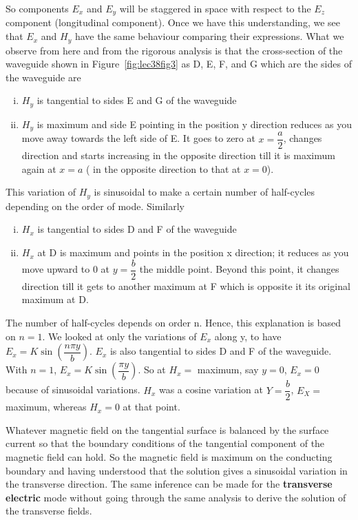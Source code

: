 So components $E_x$ and $E_y$ will be staggered in space with respect to the $E_z$ component (longitudinal component). Once we have this understanding, we see that $E_x$ and $H_y$ have the same behaviour comparing their expressions. What we observe from here and from the rigorous analysis is that the cross-section of the waveguide shown in Figure~\ref{fig:lec38fig3} as D, E, F, and G which are the sides of the waveguide are
\begin{enumerate}[(i)]
\item $H_y$ is tangential to sides E and G of the waveguide
\item $H_y$ is maximum and side E pointing in the position y direction reduces as you move away towards the left side of E. It goes to zero at $x=\dfrac{a}{2}$, changes direction and starts increasing in the opposite direction till it is maximum again at $x=a$ ( in the opposite direction to that at $x=0$). 
\end{enumerate}
This variation of $H_y$ is sinusoidal to make a certain number of half-cycles depending on the order of mode. Similarly 
\begin{enumerate}[(i)]
\item $H_x$ is tangential to sides D and F of the waveguide
\item $H_x$ at D is maximum and points in the position x direction; it reduces as you move upward to 0 at $y=\dfrac{b}{2}$ the middle point. Beyond this point, it changes direction till it gets to another maximum at F which is opposite it its original maximum at D. 
\end{enumerate}
The number of half-cycles depends on order n. Hence, this explanation is based on $n=1$. We looked at only the variations of $E_x$ along y, to have $E_x = K\sin\left(\dfrac{n\pi y}{b}\right)$. $E_x$  is also tangential to sides D and F of the waveguide. With $n=1$, $E_x = K\sin\left(\dfrac{\pi y}{b}\right)$. So at $H_x = $ maximum, say $y=0$, $E_x = 0$ because of sinusoidal variations. $H_x$ was a cosine variation at $Y=\dfrac{b}{2}$, $E_X = $ maximum, whereas $H_x = 0$ at that point.

Whatever magnetic field on the tangential surface is balanced by the surface current so that the boundary conditions of the tangential component of the magnetic field can hold. So the magnetic field is maximum on the conducting boundary and having understood that the solution gives a sinusoidal variation in the transverse direction. The same inference can be made for the \textbf{transverse electric} mode without going through the same analysis to derive the solution of the transverse fields.


